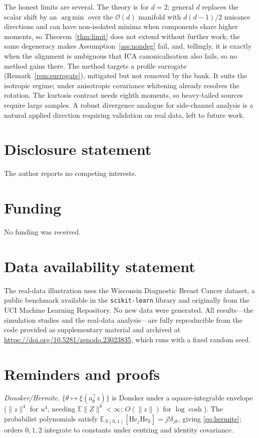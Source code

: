 \documentclass[]{interact}
\theoremstyle{plain}
\theoremstyle{remark}
\newcommand{\E}{\mathbb{E}}
\newcommand{\Ocal}{\mathcal{O}}
\newcommand{\He}{\mathrm{He}}
\DeclareMathOperator*{\argmin}{arg\,min}
\begin{document}
The honest limits are several. The theory is for $d=2$; general $d$ replaces the
scalar shift by an $\argmin$ over the $\Ocal(d)$ manifold with $d(d-1)/2$ nuisance
directions and can have non-isolated minima when components share higher moments,
so Theorem~\ref{thm:limit} does not extend without further work; the same
degeneracy makes Assumption~\ref{ass:nondeg} fail, and, tellingly, it is exactly
when the alignment is ambiguous that ICA canonicalisation also fails, so no method
gains there. The method targets a profile surrogate (Remark~\ref{rem:surrogate}),
mitigated but not removed by the bank. It suits the isotropic regime; under
anisotropic covariance whitening already resolves the rotation. The kurtosis
contrast needs eighth moments, so heavy-tailed sources require large samples. A
robust divergence analogue for side-channel analysis is a natural applied direction
requiring validation on real data, left to future work.

\section*{Disclosure statement}
The author reports no competing interests.

\section*{Funding}
No funding was received.

\section*{Data availability statement}
The real-data illustration uses the Wisconsin Diagnostic Breast Cancer dataset, a
public benchmark available in the \texttt{scikit-learn} library and originally from
the UCI Machine Learning Repository. No new data were generated. All results---the
simulation studies and the real-data analysis---are fully reproducible from the code
provided as supplementary material and archived at
\url{https://doi.org/10.5281/zenodo.23023835}, which runs with a fixed random seed.

\appendix

\section{Reminders and proofs}
\label{app}

\emph{Donsker/Hermite.} $\{\theta\mapsto\xi(a_\theta^\top z)\}$ is Donsker under a
square-integrable envelope ($\|z\|^4$ for $u^4$, needing $\E\|Z\|^8<\infty$;
$O(\|z\|)$ for $\log\cosh$). The probabilist polynomials satisfy
$\E_{N(0,1)}[\He_j\He_k]=j!\delta_{jk}$, giving \eqref{eq:hermite}; orders $0,1,2$
integrate to constants under centring and identity covariance.
\end{document}
